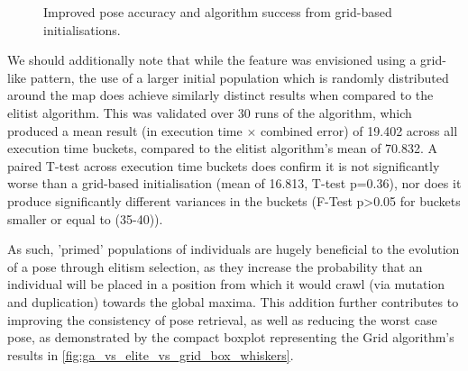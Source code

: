 \documentclass[authoryearcitations]{UoYCSproject}
\begin{document}
\datatablegridstdev

\begin{figure}
	\centering
	\caption{Improved pose accuracy and algorithm success from grid-based initialisations.}
	\label{fig:grid_vs_rand_stdev}
\end{figure}

We should additionally note that while the feature was envisioned using a grid-like pattern, the use of a larger initial population which is randomly distributed around the map does achieve similarly distinct results when compared to the elitist algorithm. This was validated over 30 runs of the algorithm, which produced a mean result (in execution time $\times$ combined error) of 19.402 across all execution time buckets, compared to the elitist algorithm's mean of 70.832. A paired T-test across execution time buckets does confirm it is not significantly worse than a grid-based initialisation (mean of 16.813, T-test p=0.36), nor does it produce significantly different variances in the buckets (F-Test p>0.05 for buckets smaller or equal to (35-40)). 

As such, 'primed' populations of individuals are hugely beneficial to the evolution of a pose through elitism selection, as they increase the probability that an individual will be placed in a position from which it would crawl (via mutation and duplication) towards the global maxima. This addition further contributes to improving the consistency of pose retrieval, as well as reducing the worst case pose, as demonstrated by the compact boxplot representing the Grid algorithm's results in \autoref{fig:ga_vs_elite_vs_grid_box_whiskers}.
\end{document}
